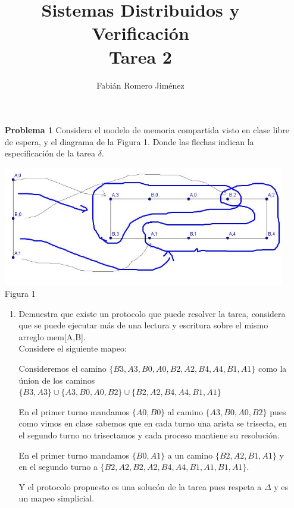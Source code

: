 \documentclass{article}
\title{Sistemas Distribuidos y Verificación \\ Tarea 2}
\author{Fabián Romero Jiménez}
\begin{document}
\maketitle

\begin{enumerate}

\item[\bf{Problema 1}] Considera el modelo de memoria compartida visto en clase libre de espera, y el diagrama de la Figura 1. Donde las flechas indican la especificación de la tarea $\delta$.\\

\begin{center}
  \includegraphics[width=350pt]{t2_f1.jpeg}\\
  Figura 1
\end{center}

\begin{enumerate}

\item Demuestra que existe un protocolo que puede resolver la tarea, considera que se puede ejecutar más de una lectura y escritura sobre el mismo arreglo mem[A,B].\\

  Considere el siguiente mapeo:
  
  Consideremos el camino $\{B3,A3,B0,A0,B2,A2,B4,A4,B1,A1\}$ como la únion de los caminos $\{B3,A3\} \cup \{A3,B0,A0,B2\} \cup \{B2,A2,B4,A4,B1,A1\}$
  
  En el primer turno mandamos $\{A0,B0\}$ al camino $\{A3,B0,A0,B2\}$ pues como vimos en clase sabemos que en cada turno una arista se trisecta, en el segundo turno no trisectamos y cada proceso mantiene su resolución.

  En el primer turno mandamos $\{B0,A1\}$ a un camino $\{B2,A2,B1,A1\}$ y en el segundo turno a $\{B2,A2,B2,A2,B4,A4,B1,A1,B1,A1\}$.

 Y el protocolo propuesto es una solucón de la tarea pues respeta a $\Delta$ y es un mapeo simplicial.


\end{enumerate}
\end{enumerate}
\end{document}
